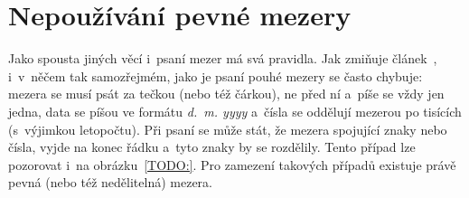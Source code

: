 

\section{Nepoužívání pevné mezery}
Jako spousta jiných věcí i~psaní mezer má svá pravidla. Jak zmiňuje
článek~\cite{Ctenar_12_2015}, i~v~něčem tak samozřejmém, jako je psaní pouhé
mezery se často chybuje: mezera se musí psát za tečkou (nebo též čárkou), ne před
ní a~píše se vždy jen jedna, data se píšou ve formátu \emph{d.~m. yyyy}
a~čísla se oddělují mezerou po tisících (s~výjimkou letopočtu). Při psaní se může
stát, že mezera spojující znaky nebo čísla, vyjde na konec řádku a~tyto znaky
by se rozdělily. Tento případ lze pozorovat i~na obrázku~\ref{TODO:}.
Pro zamezení takových případů existuje právě pevná (nebo též nedělitelná)
mezera.

